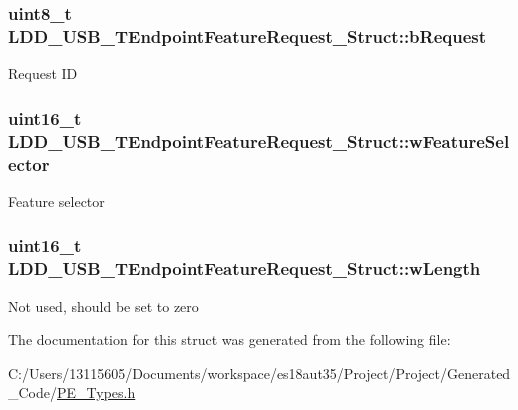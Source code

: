 \subsubsection[{b\+Request}]{\setlength{\rightskip}{0pt plus 5cm}uint8\+\_\+t L\+D\+D\+\_\+\+U\+S\+B\+\_\+\+T\+Endpoint\+Feature\+Request\+\_\+\+Struct\+::b\+Request}\label{struct_l_d_d___u_s_b___t_endpoint_feature_request___struct_acd2dcd4a8762d22f84cfe3b9d9607a25}
Request I\+D \hypertarget{struct_l_d_d___u_s_b___t_endpoint_feature_request___struct_aa026e7ce420430dc65a72dcc10337553}{}
\subsubsection[{w\+Feature\+Selector}]{\setlength{\rightskip}{0pt plus 5cm}uint16\+\_\+t L\+D\+D\+\_\+\+U\+S\+B\+\_\+\+T\+Endpoint\+Feature\+Request\+\_\+\+Struct\+::w\+Feature\+Selector}\label{struct_l_d_d___u_s_b___t_endpoint_feature_request___struct_aa026e7ce420430dc65a72dcc10337553}
Feature selector \hypertarget{struct_l_d_d___u_s_b___t_endpoint_feature_request___struct_aec7dc034039bc4deb5c811afac0686a5}{}
\subsubsection[{w\+Length}]{\setlength{\rightskip}{0pt plus 5cm}uint16\+\_\+t L\+D\+D\+\_\+\+U\+S\+B\+\_\+\+T\+Endpoint\+Feature\+Request\+\_\+\+Struct\+::w\+Length}\label{struct_l_d_d___u_s_b___t_endpoint_feature_request___struct_aec7dc034039bc4deb5c811afac0686a5}
Not used, should be set to zero 

The documentation for this struct was generated from the following file\+:\begin{DoxyCompactItemize}
\item 
C\+:/\+Users/13115605/\+Documents/workspace/es18aut35/\+Project/\+Project/\+Generated\+\_\+\+Code/\hyperlink{_p_e___types_8h}{P\+E\+\_\+\+Types.\+h}\end{DoxyCompactItemize}
